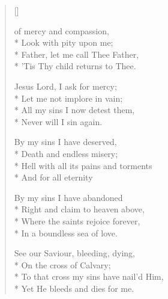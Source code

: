 \newHymn
{}

\begin{verse}[\versewidth]

\begin{altverse}
 of mercy and compassion,\\*
Look with pity upon me;\\*
Father, let me call Thee Father,\\*
'Tis Thy child returns to Thee.
\end{altverse}

\begin{indentedVerse}
\begin{altverse}
\vin Jesus Lord, I ask for mercy;\\*
\vin Let me not implore in vain;\\*
\vin All my sins I now detest them,\\*
\vin Never will I sin again.
\end{altverse}
\end{indentedVerse}

\begin{altverse}
By my sins I have deserved,\\*
Death and endless misery;\\*
Hell with all its pains and torments\\*
And for all eternity
\end{altverse}

\begin{altverse}
By my sins I have abandoned\\*
Right and claim to heaven above,\\*
Where the saints rejoice forever,\\*
In a boundless sea of love.
\end{altverse}

\begin{altverse}
See our Saviour, bleeding, dying,\\*
On the cross of Calvary;\\*
To that cross my sins have nail'd Him,\\*
Yet He bleeds and dies for me.
\end{altverse}

\end{verse}


